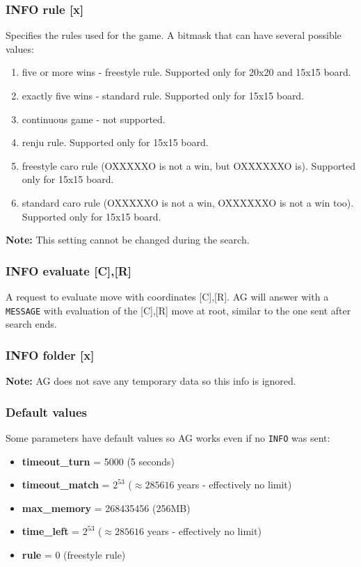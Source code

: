 \documentclass[12pt,a4paper]{article}
\begin{document}
\subsubsection{INFO rule [x]}
\label{cmd_info_rule}
Specifies the rules used for the game. A bitmask that can have several possible values:
\begin{enumerate}[leftmargin=7.5em]
	\item[\text{$[x]=0$}]{five or more wins - freestyle rule. Supported only for 20x20 and 15x15 board.}
	\item[\text{$[x]=1$}]{exactly five wins - standard rule. Supported only for 15x15 board.}
	\item[\text{$[x]=2$}]{continuous game - not supported.}
	\item[\text{$[x]=4$}]{renju rule. Supported only for 15x15 board.}
	\item[\text{$[x]=8$}]{freestyle caro rule (OXXXXXO is not a win, but OXXXXXXO is). Supported only for 15x15 board.}
	\item[\text{$[x]=9$}]{standard caro rule (OXXXXXO is not a win, OXXXXXXO is not a win too). Supported only for 15x15 board.}
\end{enumerate}

\textbf{Note:} This setting cannot be changed during the search.

\subsubsection{INFO evaluate [C],[R]}
\label{cmd_info_evaluate}
A request to evaluate move with coordinates [C],[R]. AG will answer with a \texttt{MESSAGE} with evaluation of the [C],[R] move at root, similar to the one sent after search ends.

\subsubsection{INFO folder [x]}
\label{cmd_info_folder}
\textbf{Note:} AG does not save any temporary data so this info is ignored.

\subsubsection{Default values}
Some parameters have default values so AG works even if no \texttt{INFO} was sent:
\begin{itemize}
\item{\textbf{timeout{\_}turn } = 5000 (5 seconds)}
\item{\textbf{timeout{\_}match} = $2^{53}$ ($\approx 285616$ years - effectively no limit)}
\item{\textbf{max{\_}memory} = 268435456 (256MB)}
\item{\textbf{time{\_}left} = $2^{53}$ ($\approx 285616$ years - effectively no limit)}
\item{\textbf{rule} = 0 (freestyle rule)}
\end{itemize}
\end{document}
